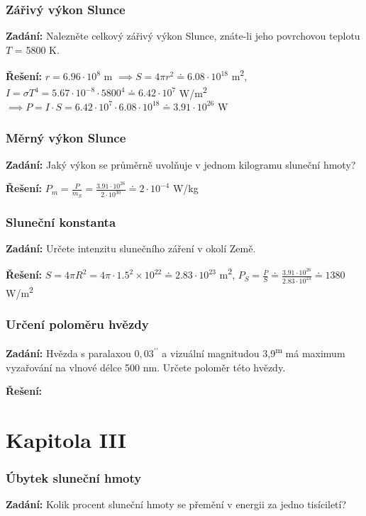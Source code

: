 \documentclass{article}
\begin{document}
\section*{Zářivý výkon Slunce}
\textbf{Zadání:} Nalezněte celkový zářivý výkon Slunce, znáte-li jeho povrchovou teplotu $T$ = 5800 K.

\textbf{Řešení:} $r = 6.96 \cdot 10^8$ m $\implies S = 4 \pi r^2 \doteq 6.08 \cdot 10^{18}$ m\textsuperscript{2}, $I = \sigma T^4 = 5.67 \cdot 10^{-8} \cdot 5800^4 \doteq 6.42 \cdot 10^7$ W/m\textsuperscript{2} $ \implies P = I \cdot S = 6.42 \cdot 10^7 \cdot 6.08 \cdot 10^{18} \doteq 3.91 \cdot 10^{26}$ W

\section*{Měrný výkon Slunce}
\textbf{Zadání:} Jaký výkon se průměrně uvolňuje v jednom kilogramu sluneční hmoty?

\textbf{Řešení:} $P_m = \frac{P}{m_S} = \frac{3.91 \cdot 10^{26}}{2 \cdot 10^{30}} \doteq 2 \cdot 10^{-4}$ W/kg

\section*{Sluneční konstanta}
\textbf{Zadání:} Určete intenzitu slunečního záření v okolí Země.

\textbf{Řešení:} $S = 4\pi R^2 = 4 \pi \cdot 1.5^2 \times 10^{22} \doteq 2.83 \cdot 10^{23}$ m\textsuperscript{2}, $P_S = \frac{P}{S} \doteq \frac{3.91 \cdot 10^{26}}{2.83 \cdot 10^{23}} \doteq 1380$ W/m\textsuperscript{2}

\section*{Určení poloměru hvězdy}
\textbf{Zadání:} Hvězda s paralaxou $0,03^{\prime\prime}$ a vizuální magnitudou 3,9\textsuperscript{m} má maximum vyzařování na
vlnové délce 500 nm. Určete poloměr této hvězdy.

\textbf{Řešení:}

\part*{Kapitola \textrm{I\hspace{-.1em}I\hspace{-.1em}I}}

\section*{Úbytek sluneční hmoty}
\textbf{Zadání:} Kolik procent sluneční hmoty se přemění v energii za jedno tisíciletí?
\end{document}
